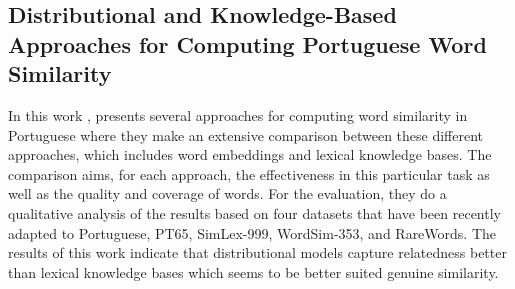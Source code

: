 \subsection{Distributional and Knowledge-Based Approaches for Computing Portuguese Word Similarity}

In this work , presents several approaches for computing word similarity in Portuguese where they make an extensive comparison between these different approaches, which includes word embeddings and lexical knowledge bases. The comparison aims, for each approach, the effectiveness in this particular task as well as the quality and coverage of words. For the evaluation, they do a qualitative analysis of the results based on four datasets that have been recently adapted to Portuguese, PT65, SimLex-999, WordSim-353, and RareWords.
The results of this work indicate that distributional models capture relatedness better than lexical knowledge bases which seems to be better suited genuine similarity.
